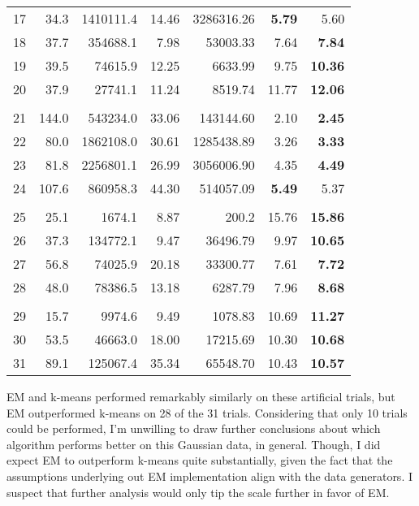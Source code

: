 \documentclass{journal}
\begin{document}
\begin{table}[hp]
\begin{tabular}{lrrrrrr}
    17 & 34.3 & 1410111.4 & 14.46 & 3286316.26 & \textbf{5.79} & 5.60 \\
    18 & 37.7 & 354688.1 & 7.98 & 53003.33 & 7.64  & \textbf{7.84} \\
    19 & 39.5 & 74615.9 & 12.25 & 6633.99 & 9.75  & \textbf{10.36} \\
    20 & 37.9 & 27741.1 & 11.24 & 8519.74 & 11.77 & \textbf{12.06}  \\ \\

    21 & 144.0 & 543234.0 & 33.06 & 143144.60 & 2.10  & \textbf{2.45} \\
    22 & 80.0 & 1862108.0 & 30.61 & 1285438.89 & 3.26  & \textbf{3.33} \\
    23 & 81.8 & 2256801.1 & 26.99 & 3056006.90 & 4.35  & \textbf{4.49} \\
    24 & 107.6 & 860958.3 & 44.30 & 514057.09 & \textbf{5.49} & 5.37 \\ \\

    25 & 25.1 & 1674.1 & 8.87 & 200.2 & 15.76 & \textbf{15.86}  \\
    26 & 37.3 & 134772.1 & 9.47  & 36496.79 & 9.97  & \textbf{10.65} \\
    27 & 56.8 & 74025.9 & 20.18 & 33300.77 & 7.61  & \textbf{7.72} \\
    28 & 48.0 & 78386.5 & 13.18 & 6287.79 & 7.96  & \textbf{8.68} \\ \\

    29 & 15.7 & 9974.6 & 9.49 & 1078.83 & 10.69 & \textbf{11.27}  \\
    30 & 53.5 & 46663.0 & 18.00 & 17215.69 & 10.30 & \textbf{10.68}  \\
    31 & 89.1 & 125067.4 & 35.34 & 65548.70 & 10.43 & \textbf{10.57}
\end{tabular}
\end{table}

EM and k-means performed remarkably similarly on these artificial trials, but
EM outperformed k-means on 28 of the 31 trials. Considering that only
10 trials could be performed, I'm unwilling
to draw further conclusions about which algorithm performs better on this
Gaussian data, in general. Though,
I did expect EM to outperform k-means quite substantially, given the fact that
the assumptions underlying out EM implementation align with the data generators.
I suspect that further analysis would only tip the scale further in favor of EM.
\end{document}
